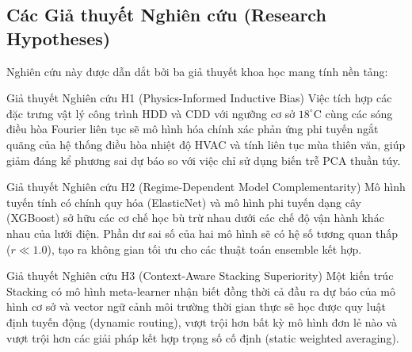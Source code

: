 \subsection{Các Giả thuyết Nghiên cứu (Research Hypotheses)}
Nghiên cứu này được dẫn dắt bởi ba giả thuyết khoa học mang tính nền tảng:

\begin{notebox}{Giả thuyết Nghiên cứu H1 (Physics-Informed Inductive Bias)}
Việc tích hợp các đặc trưng vật lý công trình HDD và CDD với ngưỡng cơ sở $18^\circ\text{C}$ cùng các sóng điều hòa Fourier liên tục sẽ mô hình hóa chính xác phản ứng phi tuyến ngắt quãng của hệ thống điều hòa nhiệt độ HVAC và tính liên tục mùa thiên văn, giúp giảm đáng kể phương sai dự báo so với việc chỉ sử dụng biến trễ PCA thuần túy.
\end{notebox}

\begin{notebox}{Giả thuyết Nghiên cứu H2 (Regime-Dependent Model Complementarity)}
Mô hình tuyến tính có chính quy hóa (ElasticNet) và mô hình phi tuyến dạng cây (XGBoost) sở hữu các cơ chế học bù trừ nhau dưới các chế độ vận hành khác nhau của lưới điện. Phần dư sai số của hai mô hình sẽ có hệ số tương quan thấp ($r \ll 1.0$), tạo ra không gian tối ưu cho các thuật toán ensemble kết hợp.
\end{notebox}

\begin{notebox}{Giả thuyết Nghiên cứu H3 (Context-Aware Stacking Superiority)}
Một kiến trúc Stacking có mô hình meta-learner nhận biết đồng thời cả đầu ra dự báo của mô hình cơ sở và vector ngữ cảnh môi trường thời gian thực sẽ học được quy luật định tuyến động (dynamic routing), vượt trội hơn bất kỳ mô hình đơn lẻ nào và vượt trội hơn các giải pháp kết hợp trọng số cố định (static weighted averaging).
\end{notebox}
